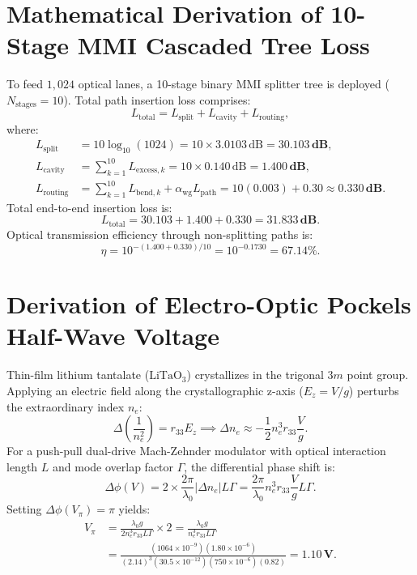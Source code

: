 \documentclass[journal]{IEEEtran}
\begin{document}
\section{Mathematical Derivation of 10-Stage MMI Cascaded Tree Loss}
To feed $1,024$ optical lanes, a 10-stage binary MMI splitter tree is deployed ($N_{\text{stages}} = 10$). Total path insertion loss comprises:
\begin{equation}
    L_{\text{total}} = L_{\text{split}} + L_{\text{cavity}} + L_{\text{routing}},
\end{equation}
where:
\begin{align}
    L_{\text{split}} &= 10 \log_{10}(1024) = 10 \times 3.0103\,\text{dB} = \mathbf{30.103\,\text{dB}}, \\
    L_{\text{cavity}} &= \sum_{k=1}^{10} L_{\text{excess}, k} = 10 \times 0.140\,\text{dB} = \mathbf{1.400\,\text{dB}}, \\
    L_{\text{routing}} &= \sum_{k=1}^{10} L_{\text{bend}, k} + \alpha_{\text{wg}} L_{\text{path}} = 10(0.003) + 0.30 \approx \mathbf{0.330\,\text{dB}}.
\end{align}
Total end-to-end insertion loss is:
\begin{equation}
    L_{\text{total}} = 30.103 + 1.400 + 0.330 = \mathbf{31.833\,\text{dB}}.
\end{equation}
Optical transmission efficiency through non-splitting paths is:
\begin{equation}
    \eta = 10^{-(1.400 + 0.330)/10} = 10^{-0.1730} = \mathbf{67.14\%}.
\end{equation}

\section{Derivation of Electro-Optic Pockels Half-Wave Voltage}
Thin-film lithium tantalate ($\text{LiTaO}_3$) crystallizes in the trigonal $3m$ point group. Applying an electric field along the crystallographic z-axis ($E_z = V / g$) perturbs the extraordinary index $n_e$:
\begin{equation}
    \Delta\left(\frac{1}{n_e^2}\right) = r_{33} E_z \implies \Delta n_e \approx -\frac{1}{2} n_e^3 r_{33} \frac{V}{g}.
\end{equation}
For a push-pull dual-drive Mach-Zehnder modulator with optical interaction length $L$ and mode overlap factor $\Gamma$, the differential phase shift is:
\begin{equation}
    \Delta\phi(V) = 2 \times \frac{2\pi}{\lambda_0} |\Delta n_e| L \Gamma = \frac{2\pi}{\lambda_0} n_e^3 r_{33} \frac{V}{g} L \Gamma.
\end{equation}
Setting $\Delta\phi(V_\pi) = \pi$ yields:
\begin{align}
    V_\pi &= \frac{\lambda_0 g}{2 n_e^3 r_{33} L \Gamma} \times 2 = \frac{\lambda_0 g}{n_e^3 r_{33} L \Gamma} \nonumber \\
    &= \frac{(1064 \times 10^{-9}) (1.80 \times 10^{-6})}{(2.14)^3 (30.5 \times 10^{-12}) (750 \times 10^{-6}) (0.82)} = \mathbf{1.10\,\text{V}}.
\end{align}
\end{document}
